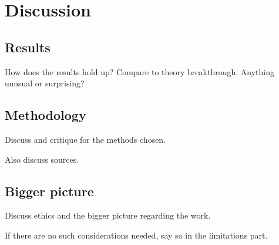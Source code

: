 \chapter{Discussion}\label{cha:discussion}


\section{Results}\label{sec:disc:results}

How does the results hold up? Compare to theory breakthrough. Anything unusual or surprising?


\section{Methodology}\label{sec:disc:method}

Discuss and critique for the methods chosen.

Also discuss sources.


\section{Bigger picture}\label{sec:disc:big}

Discuss ethics and the bigger picture regarding the work.

If there are no such considerations needed, say so in the limitations part.

